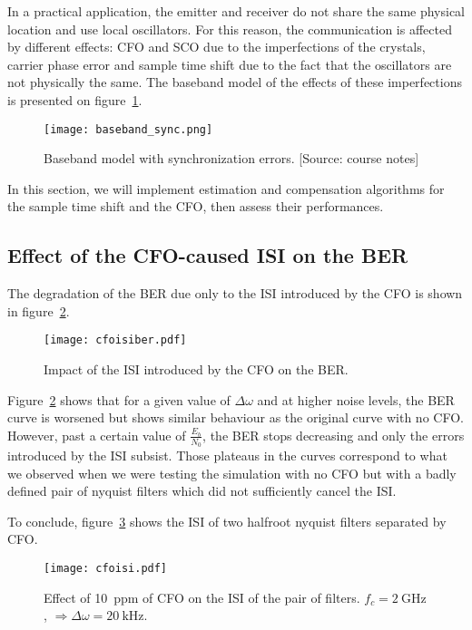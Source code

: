 In a practical application, the emitter and receiver do not share the same physical location and use local oscillators.
For this reason, the communication is affected by different effects: CFO and SCO due to the imperfections of the crystals, carrier phase error and sample time shift due to the fact that the oscillators are not physically the same.
The baseband model of the effects of these imperfections is presented on figure~\ref{fig:sync}.
\begin{figure}[htbp]
\texttt{[image: baseband\_sync.png]}
\caption[Baseband model with synchronization errors.]{Baseband model with synchronization errors. [Source: course notes]\label{fig:sync}}
\end{figure}

In this section, we will implement estimation and compensation algorithms for the sample time shift and the CFO, then assess their performances.
\subsection{Effect of the CFO-caused ISI on the BER}
The degradation of the BER due only to the ISI introduced by the CFO is shown in figure~\ref{fig:cfoisiber}.
\begin{figure}[htbp]
\centering
\texttt{[image: cfoisiber.pdf]}
\caption{Impact of the ISI introduced by the CFO on the BER.\label{fig:cfoisiber}}
\end{figure}
Figure~\ref{fig:cfoisiber} shows that for a given value of $\Delta\omega$ and at higher noise levels, the BER curve is worsened but shows similar behaviour as the original curve with no CFO.
However, past a certain value of $\frac{E_b}{N_0}$, the BER stops decreasing and only the errors introduced by the ISI subsist.
Those plateaus in the curves correspond to what we observed when we were testing the simulation with no CFO but with a badly defined pair of nyquist filters which did not sufficiently cancel the ISI.

To conclude, figure~\ref{fig:cfoisi} shows the ISI of two halfroot nyquist filters separated by CFO.
\begin{figure}[htbp]
    \centering
    \texttt{[image: cfoisi.pdf]}
    \caption[Effect of \SI{10}{ppm} of CFO on the ISI of the pair of filters.]{Effect of \SI{10}{ppm} of CFO on the ISI of the pair of filters. $f_c = \SI{2}{\giga\hertz}$, $\Rightarrow \Delta\omega = \SI{20}{\kilo\hertz}$.\label{fig:cfoisi}}
\end{figure}

